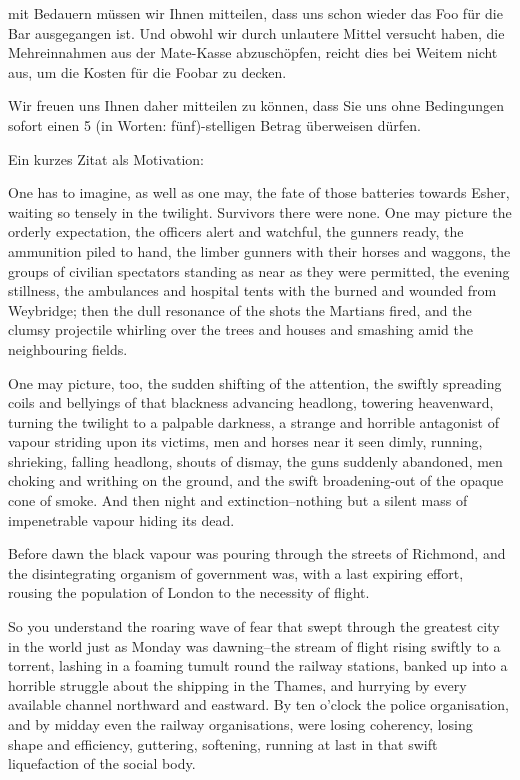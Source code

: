 \documentclass[11pt,ngerman,latin9,a4paper]{g-brief-ntz39lg19_exp}
\begin{document}
\begin{g-brief}

mit Bedauern m\"ussen wir Ihnen mitteilen, dass uns schon wieder das Foo f\"ur die Bar ausgegangen ist. Und obwohl wir durch unlautere Mittel versucht haben, die Mehreinnahmen aus der Mate-Kasse abzusch\"opfen, reicht dies bei Weitem nicht aus, um die Kosten f\"ur die Foobar zu decken.

Wir freuen uns Ihnen daher mitteilen zu k\"onnen, dass Sie uns ohne Bedingungen sofort einen 5 (in Worten: f\"unf)-stelligen Betrag \"uberweisen d\"urfen.

Ein kurzes Zitat als Motivation:

One has to imagine, as well as one may, the fate of those batteries towards Esher, waiting so tensely in the twilight.  Survivors there were none.  One may picture the orderly expectation, the officers alert and watchful, the gunners ready, the ammunition piled to hand, the limber gunners with their horses and waggons, the groups of civilian spectators standing as near as they were permitted, the evening stillness, the ambulances and hospital tents with the burned and wounded from Weybridge; then the dull resonance of the shots the Martians fired, and the clumsy projectile whirling over the trees and houses and smashing amid the neighbouring fields.

One may picture, too, the sudden shifting of the attention, the swiftly spreading coils and bellyings of that blackness advancing headlong, towering heavenward, turning the twilight to a palpable darkness, a strange and horrible antagonist of vapour striding upon its victims, men and horses near it seen dimly, running, shrieking, falling headlong, shouts of dismay, the guns suddenly abandoned, men choking and writhing on the ground, and the swift broadening-out of the opaque cone of smoke.  And then night and extinction--nothing but a silent mass of impenetrable vapour hiding its dead.

Before dawn the black vapour was pouring through the streets of Richmond, and the disintegrating organism of government was, with a last expiring effort, rousing the population of London to the necessity of flight.

So you understand the roaring wave of fear that swept through the greatest city in the world just as Monday was dawning--the stream of flight rising swiftly to a torrent, lashing in a foaming tumult round the railway stations, banked up into a horrible struggle about the shipping in the Thames, and hurrying by every available channel northward and eastward.  By ten o'clock the police organisation, and by midday even the railway organisations, were losing coherency, losing shape and efficiency, guttering, softening, running at last in that swift liquefaction of the social body.


\end{g-brief}
\end{document}
